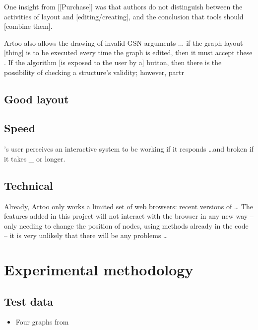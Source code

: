 One insight from [[Purchase]] was that authors do not distinguish between the activities of layout and [editing/creating], and the conclusion that tools should [combine them]. 


Artoo also allows the drawing of invalid GSN arguments ...
if the graph layout [thing] is to be executed every time the graph is edited,  then it must accept these .
If the algorithm [is exposed to the user by a] button, then there is the possibility of checking a structure's validity; however, partr



\subsection{Good layout}


\subsection{Speed}


's  user perceives an interactive system to be working if it responds \ldots and broken if it takes \_ or longer.



\subsection{Technical}

Already, Artoo only works a limited set of web browsers: recent versions of \ldots
The features added in this project will not interact with the browser in any new way -- only needing to change the position of nodes, using methods already in the code -- it is very unlikely that there will be any problems \ldots



\section{Experimental methodology}


\subsection{Test data}

\begin{itemize}
    \item Four graphs from \citet{aldenthesis}
\end{itemize}

